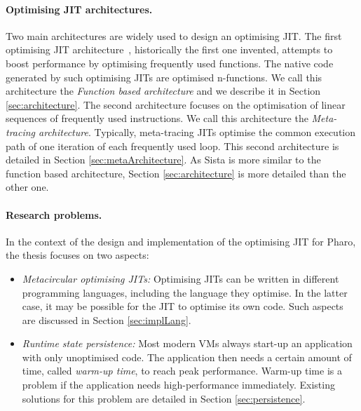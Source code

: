 \documentclass[a4paper,12pt,twoside]{../includes/ThesisStyle}
\begin{document}
\paragraph{Optimising JIT architectures.} Two main architectures are widely used to design an optimising JIT. The first optimising JIT architecture~\cite{UrsPHD}, historically the first one invented, attempts to boost performance by optimising frequently used functions. The native code generated by such optimising JITs are optimised n-functions. We call this architecture the \emph{Function based architecture} and we describe it in Section \ref{sec:architecture}. The second architecture focuses on the optimisation of linear sequences of frequently used instructions. We call this architecture the \emph{Meta-tracing architecture}. Typically, meta-tracing JITs optimise the common execution path of one iteration of each frequently used loop. This second architecture is detailed in Section \ref{sec:metaArchitecture}. As Sista is more similar to the function based architecture, Section \ref{sec:architecture} is more detailed than the other one.

\paragraph{Research problems.} In the context of the design and implementation of the optimising JIT for Pharo, the thesis focuses on 
two
aspects:
\begin{itemize}
	\item \emph{Metacircular optimising JITs: } Optimising JITs can be written in different programming languages, including the language they optimise. In the latter case, it may be possible for the JIT to optimise its own code. Such aspects are discussed in Section \ref{sec:implLang}.
	\item \emph{Runtime state persistence:} Most modern VMs always start-up an application with only unoptimised code. The application then needs a certain amount of time, called \emph{warm-up time}, to reach peak performance. Warm-up time is a problem if the application needs high-performance immediately. Existing solutions for this problem are detailed in Section \ref{sec:persistence}.
\end{itemize}
\end{document}
